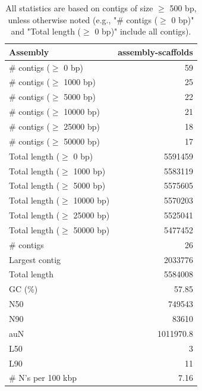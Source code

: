 \documentclass[12pt,a4paper]{article}
\begin{document}
\begin{table}[ht]
\begin{center}
\caption{All statistics are based on contigs of size $\geq$ 500 bp, unless otherwise noted (e.g., "\# contigs ($\geq$ 0 bp)" and "Total length ($\geq$ 0 bp)" include all contigs).}
\begin{tabular}{|l*{1}{|r}|}
\hline
Assembly & assembly-scaffolds \\ \hline
\# contigs ($\geq$ 0 bp) & 59 \\ \hline
\# contigs ($\geq$ 1000 bp) & 25 \\ \hline
\# contigs ($\geq$ 5000 bp) & 22 \\ \hline
\# contigs ($\geq$ 10000 bp) & 21 \\ \hline
\# contigs ($\geq$ 25000 bp) & 18 \\ \hline
\# contigs ($\geq$ 50000 bp) & 17 \\ \hline
Total length ($\geq$ 0 bp) & 5591459 \\ \hline
Total length ($\geq$ 1000 bp) & 5583119 \\ \hline
Total length ($\geq$ 5000 bp) & 5575605 \\ \hline
Total length ($\geq$ 10000 bp) & 5570203 \\ \hline
Total length ($\geq$ 25000 bp) & 5525041 \\ \hline
Total length ($\geq$ 50000 bp) & 5477452 \\ \hline
\# contigs & 26 \\ \hline
Largest contig & 2033776 \\ \hline
Total length & 5584008 \\ \hline
GC (\%) & 57.85 \\ \hline
N50 & 749543 \\ \hline
N90 & 83610 \\ \hline
auN & 1011970.8 \\ \hline
L50 & 3 \\ \hline
L90 & 11 \\ \hline
\# N's per 100 kbp & 7.16 \\ \hline
\end{tabular}
\end{center}
\end{table}
\end{document}

